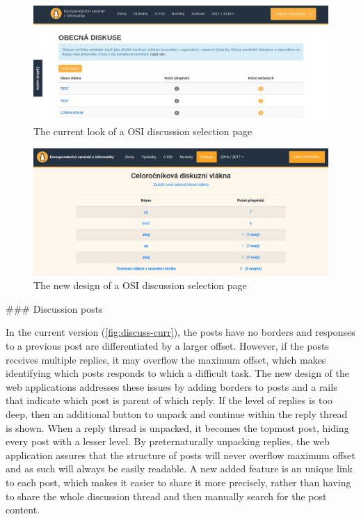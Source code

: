 \documentclass[
  digital, %
  oneside, %
  lof,     %
  lot,     %
]{fithesis4}
\begin{document}
{\begin{figure}
\includegraphics[width=\textwidth]{assets/img/discussionroot-curr}
\caption{The current look of a OSI discussion selection page}
\label{fig:discussroot-curr}
\end{figure}

\begin{figure}
\includegraphics[width=\textwidth]{assets/img/discussionroot-new}
\caption{The new design of a OSI discussion selection page}
\label{fig:discussroot-new}
\end{figure}

### Discussion posts

In the current version (\ref{fig:discuss-curr}), the posts have no borders and responses to a previous post are differentiated by a larger offset. However, if the posts receives multiple replies, it may overflow the maximum offset, which makes identifying which posts responds to which a difficult task. The new design of the web applications addresses these issues by adding borders to posts and a rails that indicate which post is parent of which reply. If the level of replies is too deep, then an additional button to unpack and continue within the reply thread is shown. When a reply thread is unpacked, it becomes the topmost post, hiding every post with a lesser level. By preternaturally unpacking replies, the web application assures that the structure of posts will never overflow maximum offset and as such will always be easily readable. A new added feature is an unique link to each post, which makes it easier to share it more precisely, rather than having to share the whole discussion thread and then manually search for the post content.

}
\end{document}
